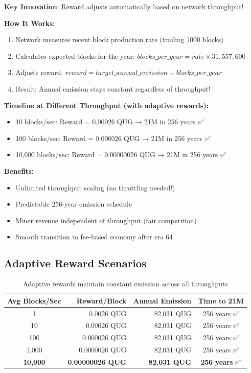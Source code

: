\documentclass[11pt,a4paper]{article}
\begin{document}
\begin{tcolorbox}[colback=accentcolor!20, colframe=accentcolor, title=Solution: Adaptive Rewards Enable 256-Year Timeline]
\textbf{Key Innovation}: Reward adjusts automatically based on network throughput!

\textbf{How It Works:}
\begin{enumerate}
    \item Network measures recent block production rate (trailing 1000 blocks)
    \item Calculates expected blocks for the year: $blocks\_per\_year = rate \times 31,557,600$
    \item Adjusts reward: $reward = target\_annual\_emission \div blocks\_per\_year$
    \item Result: Annual emission stays constant regardless of throughput!
\end{enumerate}

\textbf{Timeline at Different Throughput (with adaptive rewards):}
\begin{itemize}
    \item 10 blocks/sec: Reward = 0.00026 QUG → 21M in 256 years ✅
    \item 100 blocks/sec: Reward = 0.000026 QUG → 21M in 256 years ✅
    \item 10,000 blocks/sec: Reward = 0.00000026 QUG → 21M in 256 years ✅
\end{itemize}

\textbf{Benefits:}
\begin{itemize}
    \item Unlimited throughput scaling (no throttling needed!)
    \item Predictable 256-year emission schedule
    \item Miner revenue independent of throughput (fair competition)
    \item Smooth transition to fee-based economy after era 64
\end{itemize}
\end{tcolorbox}

\subsection{Adaptive Reward Scenarios}

\begin{table}[h]
\centering
\small
\begin{tabular}{crrc}
\toprule
\textbf{Avg Blocks/Sec} & \textbf{Reward/Block} & \textbf{Annual Emission} & \textbf{Time to 21M} \\
\midrule
1 & 0.0026 QUG & 82,031 QUG & 256 years ✅ \\
10 & 0.00026 QUG & 82,031 QUG & 256 years ✅ \\
100 & 0.000026 QUG & 82,031 QUG & 256 years ✅ \\
1,000 & 0.0000026 QUG & 82,031 QUG & 256 years ✅ \\
\textbf{10,000} & \textbf{0.00000026 QUG} & \textbf{82,031 QUG} & \textbf{256 years} ✅ \\
\bottomrule
\end{tabular}
\caption{Adaptive rewards maintain constant emission across all throughputs}
\end{table}
\end{document}
